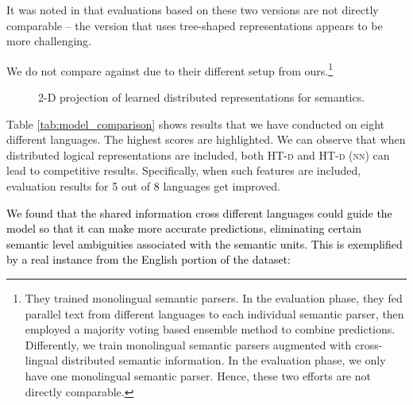 \documentclass[11pt,a4paper]{article}
\begin{document}
{{{{%
It was noted in  that evaluations based on these two versions are not directly comparable -- the version that uses tree-shaped representations appears to be more challenging.
{We do not compare against \cite{ZMJie:14} due to their different setup from ours.\footnote{
They trained monolingual semantic parsers. In the evaluation phase, they fed parallel text from different languages to each individual semantic parser, then employed a majority voting based ensemble method to combine predictions. Differently, we train monolingual semantic parsers augmented with cross-lingual distributed semantic information. In the evaluation phase, we only have one monolingual semantic parser. Hence, these two efforts are not directly comparable.
}
\begin{figure*}[t]
	\centering
\caption{2-D projection of learned distributed representations for semantics.}
	\label{fig:embedding}
	\vspace{-4mm}
\end{figure*}


Table \ref{tab:model_comparison} shows results that we have conducted on eight different languages.
The highest scores are highlighted.
We can observe that when distributed logical representations are included, both \textsc{HT-d} and \textsc{HT-d} (\textsc{nn}) can lead to competitive results.
Specifically, when such features are included, evaluation results for 5 out of 8 languages get improved.

\textcolor{black}{We found that the shared information cross different languages could guide the model so that it can make more accurate predictions,
eliminating certain semantic level ambiguities associated with the semantic units.
This is exemplified by a real instance from the English portion of the dataset:}
\begin{table}[h]
	\centering
	\scalebox{0.86}
	{
		
}
\end{table}}}}}}
\end{document}
